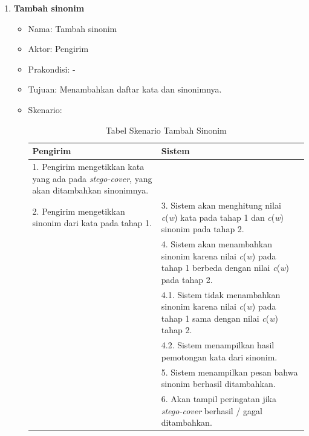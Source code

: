 \begin{enumerate}
	\item \textbf{Tambah sinonim}
	\begin{itemize}
		\item Nama: Tambah sinonim
		\item Aktor: Pengirim
		\item Prakondisi: -
		\item Tujuan: Menambahkan daftar kata dan sinonimnya.
		\item Skenario:
		\begin{table}[H]
		\centering
		\caption{Tabel Skenario Tambah Sinonim}
		\begin{tabular}{| p{6.5cm} | p{6.5cm} |}\hline
		Pengirim & Sistem \\
		\hline
				1. Pengirim mengetikkan kata yang ada pada \textit{stego-cover}, yang akan ditambahkan sinonimnya. & \\
				\hline
				2. Pengirim mengetikkan sinonim dari kata pada tahap 1. & 3. Sistem akan menghitung nilai \textit{c}(\textit{w}) kata pada tahap 1 dan \textit{c}(\textit{w}) sinonim pada tahap 2. \\
				\hline
				& 4. Sistem akan menambahkan sinonim karena nilai \textit{c}(\textit{w}) pada tahap 1 berbeda dengan nilai \textit{c}(\textit{w}) pada tahap 2. \\
				& 4.1. Sistem tidak menambahkan sinonim karena nilai \textit{c}(\textit{w}) pada tahap 1 sama dengan nilai \textit{c}(\textit{w}) tahap 2. \\
				& 4.2. Sistem menampilkan hasil pemotongan kata dari sinonim. \\
				\hline
				& 5. Sistem menampilkan pesan bahwa sinonim berhasil ditambahkan. \\
				\hline
				& 6. Akan tampil peringatan jika \textit{stego-cover} berhasil / gagal ditambahkan. \\
		\hline
		\end{tabular}
		\end{table}
	\end{itemize}
	

\end{enumerate}
